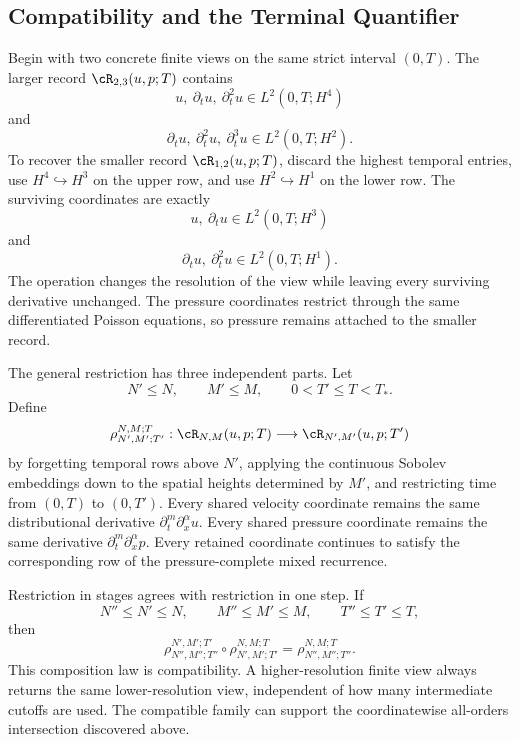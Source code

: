
\subsection{Compatibility and the Terminal Quantifier}\label{sub:CompatibilityAndTheTerminalQuantifier}

Begin with two concrete finite views on the same strict interval \((0,T)\).
The larger record \(\cR_{2,3}(u,p;T)\) contains
\[
  u,
  \ \partial_tu,
  \ \partial_t^2u
  \in
  L^2(0,T;H^4)
\]
and
\[
  \partial_tu,
  \ \partial_t^2u,
  \ \partial_t^3u
  \in
  L^2(0,T;H^2).
\]
To recover the smaller record \(\cR_{1,2}(u,p;T)\), discard the highest temporal entries, use \(H^4\hookrightarrow H^3\) on the upper row, and use \(H^2\hookrightarrow H^1\) on the lower row.
The surviving coordinates are exactly
\[
  u,
  \ \partial_tu
  \in
  L^2(0,T;H^3)
\]
and
\[
  \partial_tu,
  \ \partial_t^2u
  \in
  L^2(0,T;H^1).
\]
The operation changes the resolution of the view while leaving every surviving derivative unchanged.
The pressure coordinates restrict through the same differentiated Poisson equations, so pressure remains attached to the smaller record.

The general restriction has three independent parts.
Let
\[
  N'\leq N,
  \qquad
  M'\leq M,
  \qquad
  0<T'\leq T<T_*.
\]
Define
\[
  \rho_{N',M';T'}^{N,M;T}:
  \cR_{N,M}(u,p;T)
  \longrightarrow
  \cR_{N',M'}(u,p;T')
\]
by forgetting temporal rows above \(N'\), applying the continuous Sobolev embeddings down to the spatial heights determined by \(M'\), and restricting time from \((0,T)\) to \((0,T')\).
Every shared velocity coordinate remains the same distributional derivative \(\partial_t^m\partial_x^\alpha u\).
Every shared pressure coordinate remains the same derivative \(\partial_t^m\partial_x^\alpha p\).
Every retained coordinate continues to satisfy the corresponding row of the pressure-complete mixed recurrence.

Restriction in stages agrees with restriction in one step.
If
\[
  N''\leq N'\leq N,
  \qquad
  M''\leq M'\leq M,
  \qquad
  T''\leq T'\leq T,
\]
then
\[
  \rho_{N'',M'';T''}^{N',M';T'}
  \circ
  \rho_{N',M';T'}^{N,M;T}
  =
  \rho_{N'',M'';T''}^{N,M;T}.
\]
This composition law is compatibility.
A higher-resolution finite view always returns the same lower-resolution view, independent of how many intermediate cutoffs are used.
The compatible family can support the coordinatewise all-orders intersection discovered above.

